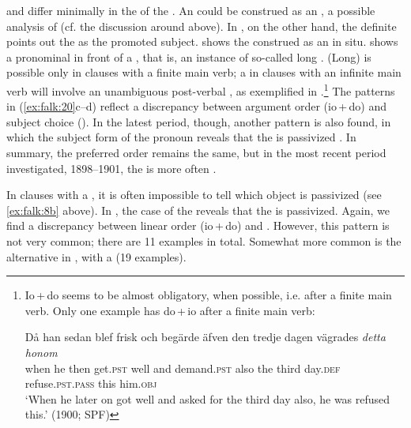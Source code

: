 \documentclass[output=paper]{langscibook}
\begin{document}
 and  differ minimally in the  of the . An   could be construed as an , a possible analysis of  (cf. the discussion around  above). In , on the other hand, the definite  points out the  as the promoted subject.  shows the  construed as an  in situ.  shows a pronominal  in front of a , that is, an instance of so-called long . (Long)  is possible only in clauses with a finite main verb; a  in clauses with an infinite main verb will involve an unambiguous post-verbal , as exemplified in .{\footnote{Io\,+\,do seems to be almost obligatory, when possible, i.e. after a finite main verb. Only one example has do\,+\,io after a finite main verb:

\ea \gll Då    han  sedan  blef    frisk  och  begärde    äfven  den  tredje  dagen  vägrades \textit{detta}  \textit{honom}\\
         when  he    then  get.\textsc{pst}  well  and  demand.\textsc{pst}  also    the  third  day.\textsc{def}  refuse\textsc{.pst.pass}  this  him.\textsc{obj}\\
         \glt ‘When he later on got well and asked for the third day also, he was refused this.’ (1900; SPF)
\z}} The patterns in (\ref{ex:falk:20}c–d) reflect a discrepancy between argument order (io\,+\,do) and subject choice (). In the latest period, though, another pattern is also found, in which the subject form of the pronoun reveals that the  is passivized . In summary, the preferred order remains the same, but in the most recent period investigated, 1898–1901, the  is more often .


In clauses with a , it is often impossible to tell which object is passivized (see \ref{ex:falk:8b} above). In , the case of the  reveals that the  is passivized. Again, we find a discrepancy between linear order (io\,+\,do) and . However, this pattern is not very common; there are 11 examples in total. Somewhat more common is the alternative in , with a  (19 examples).
\end{document}
